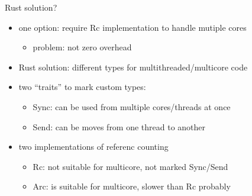 \begin{frame}{Rust solution?}
\begin{itemize}
\item one option: require Rc implementation to handle mutiple cores
    \begin{itemize}
    \item problem: not zero overhead
    \end{itemize}
\item Rust solution: different types for multithreaded/multicore code
\item two ``traits'' to mark custom types:
    \begin{itemize}
    \item Sync: can be used from multiple cores/threads at once
    \item Send: can be moves from one thread to another
    \end{itemize}
\item two implementations of referenc counting
    \begin{itemize}
    \item Rc: not suitable for multicore, not marked Sync/Send
    \item Arc: is suitable for multicore, slower than Rc probably
    \end{itemize}
\end{itemize}
\end{frame}
